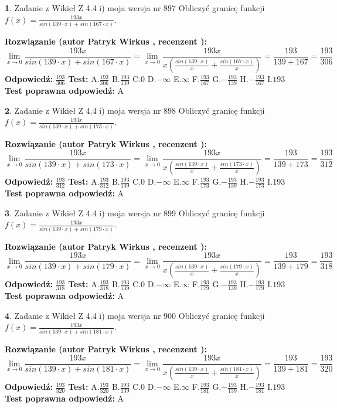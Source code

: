 \documentclass[12pt, a4paper]{article}
\theoremstyle{definition} %
\newtheorem{zad}{}
\newcommand{\zadStart}[1]{\begin{zad}#1\newline}
\newcommand{\zadStop}{\end{zad}}
\newcommand{\rozwStart}[2]{\noindent \textbf{Rozwiązanie (autor #1 , recenzent #2): }\newline}
\newcommand{\rozwStop}{\newline}
\newcommand{\odpStart}{\noindent \textbf{Odpowiedź:}\newline}
\newcommand{\odpStop}{\newline}
\newcommand{\testStart}{\noindent \textbf{Test:}\newline}
\newcommand{\testStop}{\newline}
\newcommand{\kluczStart}{\noindent \textbf{Test poprawna odpowiedź:}\newline}
\newcommand{\kluczStop}{\newline}
\begin{document}
\zadStart{Zadanie z Wikieł Z 4.4 i) moja wersja nr 897}
Obliczyć granicę funkcji $f(x)=\frac{193x}{sin(139\cdot x) +sin(167\cdot x)}$.
\zadStop
\rozwStart{Patryk Wirkus}{}
$$\lim\limits_{x\to 0}\frac{193x}{sin(139\cdot x) +sin(167\cdot x)}=\lim\limits_{x\to 0}\frac{193x}{x(\frac{sin(139\cdot x)}{x}+\frac{sin(167\cdot x)}{x})}=\frac{193}{139+167} = \frac{193}{306}$$
\rozwStop
\odpStart
$\frac{193}{306}$
\odpStop
\testStart
A.$\frac{193}{306}$
B.$\frac{193}{139}$
C.$0$
D.$-\infty$
E.$\infty$
F.$\frac{193}{167}$
G.$-\frac{193}{139}$
H.$-\frac{193}{167}$
I.$193$
\testStop
\kluczStart
A
\kluczStop



\zadStart{Zadanie z Wikieł Z 4.4 i) moja wersja nr 898}
Obliczyć granicę funkcji $f(x)=\frac{193x}{sin(139\cdot x) +sin(173\cdot x)}$.
\zadStop
\rozwStart{Patryk Wirkus}{}
$$\lim\limits_{x\to 0}\frac{193x}{sin(139\cdot x) +sin(173\cdot x)}=\lim\limits_{x\to 0}\frac{193x}{x(\frac{sin(139\cdot x)}{x}+\frac{sin(173\cdot x)}{x})}=\frac{193}{139+173} = \frac{193}{312}$$
\rozwStop
\odpStart
$\frac{193}{312}$
\odpStop
\testStart
A.$\frac{193}{312}$
B.$\frac{193}{139}$
C.$0$
D.$-\infty$
E.$\infty$
F.$\frac{193}{173}$
G.$-\frac{193}{139}$
H.$-\frac{193}{173}$
I.$193$
\testStop
\kluczStart
A
\kluczStop



\zadStart{Zadanie z Wikieł Z 4.4 i) moja wersja nr 899}
Obliczyć granicę funkcji $f(x)=\frac{193x}{sin(139\cdot x) +sin(179\cdot x)}$.
\zadStop
\rozwStart{Patryk Wirkus}{}
$$\lim\limits_{x\to 0}\frac{193x}{sin(139\cdot x) +sin(179\cdot x)}=\lim\limits_{x\to 0}\frac{193x}{x(\frac{sin(139\cdot x)}{x}+\frac{sin(179\cdot x)}{x})}=\frac{193}{139+179} = \frac{193}{318}$$
\rozwStop
\odpStart
$\frac{193}{318}$
\odpStop
\testStart
A.$\frac{193}{318}$
B.$\frac{193}{139}$
C.$0$
D.$-\infty$
E.$\infty$
F.$\frac{193}{179}$
G.$-\frac{193}{139}$
H.$-\frac{193}{179}$
I.$193$
\testStop
\kluczStart
A
\kluczStop



\zadStart{Zadanie z Wikieł Z 4.4 i) moja wersja nr 900}
Obliczyć granicę funkcji $f(x)=\frac{193x}{sin(139\cdot x) +sin(181\cdot x)}$.
\zadStop
\rozwStart{Patryk Wirkus}{}
$$\lim\limits_{x\to 0}\frac{193x}{sin(139\cdot x) +sin(181\cdot x)}=\lim\limits_{x\to 0}\frac{193x}{x(\frac{sin(139\cdot x)}{x}+\frac{sin(181\cdot x)}{x})}=\frac{193}{139+181} = \frac{193}{320}$$
\rozwStop
\odpStart
$\frac{193}{320}$
\odpStop
\testStart
A.$\frac{193}{320}$
B.$\frac{193}{139}$
C.$0$
D.$-\infty$
E.$\infty$
F.$\frac{193}{181}$
G.$-\frac{193}{139}$
H.$-\frac{193}{181}$
I.$193$
\testStop
\kluczStart
A
\kluczStop
\end{document}
